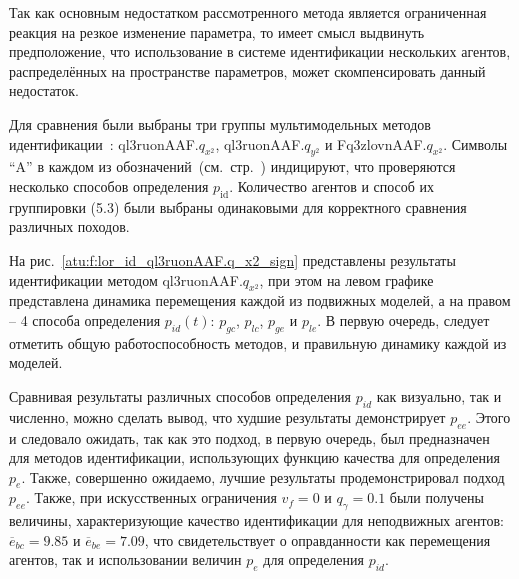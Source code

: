 Так как основным недостатком рассмотренного метода является
ограниченная реакция на резкое изменение параметра,
то имеет смысл выдвинуть предположение,
что использование в системе идентификации нескольких агентов,
распределённых на пространстве параметров, может
скомпенсировать данный недостаток.


Для сравнения были выбраны три группы мультимодельных методов идентификации~\cite{atu_ISDMCI2015,atu_asau26}:
ql3ruonAAF.$q_{x^2}$,
ql3ruonAAF.$q_{y^2}$ и
Fq3zlovnAAF.$q_{x^2}$.
Символы ``A'' в каждом из
обозначений~(см.~стр.~\pageref{atu:id_classification})
индицируют, что проверяются
несколько способов определения $p_\mathrm{id}$.
Количество агентов и способ их группировки (5.3) были выбраны
одинаковыми для корректного сравнения различных походов.


На рис.~\ref{atu:f:lor_id_ql3ruonAAF.q_x2_sign} представлены результаты идентификации
методом ql3ruonAAF.$q_{x^2}$, при этом на левом графике представлена
динамика перемещения каждой из подвижных моделей,
а на правом -- 4 способа определения $p_{id}(t)$:
$p_{gc}$, $p_{lc}$, $p_{ge}$ и $p_{le}$.
В первую очередь, следует отметить общую работоспособность
методов, и правильную динамику каждой из моделей.


Сравнивая результаты различных способов определения
$p_{id}$ как визуально, так и численно, можно сделать
вывод, что худшие результаты демонстрирует $p_{ee}$.
Этого и следовало ожидать, так как это подход, в первую очередь,
был предназначен для методов идентификации, использующих
функцию качества для определения $p_e$.
Также, совершенно ожидаемо, лучшие результаты продемонстрировал
подход $p_{ee}$. Также, при искусственных ограничения
$v_f=0$ и $q_\gamma=0.1$ были получены величины,
характеризующие качество идентификации для неподвижных агентов:
$\overline{e}_{bc}=9.85$
и
$\overline{e}_{be}=7.09$, что свидетельствует
о оправданности как перемещения агентов,
так и использовании величин $p_e$ для определения $p_{id}$.



